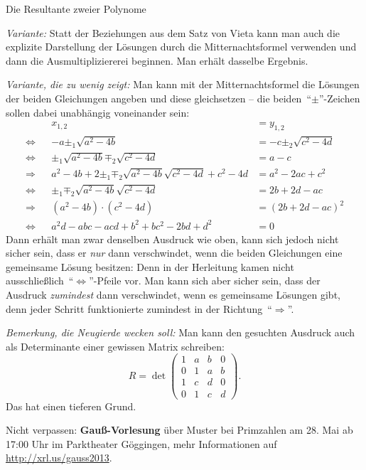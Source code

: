 \documentclass{algblatt}
\begin{document}
\begin{aufgabe}{Die Resultante zweier Polynome}
\begin{loesungE}
\emph{Variante:} Statt der Beziehungen aus dem Satz von Vieta kann man auch die
explizite Darstellung der Lösungen durch die Mitternachtsformel verwenden und
dann die Ausmultipliziererei beginnen. Man erhält dasselbe Ergebnis.

\emph{Variante, die zu wenig zeigt:} Man kann mit der Mitternachtsformel die
Lösungen der beiden Gleichungen angeben und diese gleichsetzen -- die
beiden~"`$\pm$"'-Zeichen sollen dabei unabhängig voneinander sein:
\begin{align*}
  && x_{1,2} &= y_{1,2} \\
  \Longleftrightarrow &&
    -a \pm_1 \sqrt{a^2 - 4b} &= -c \pm_2 \sqrt{c^2 - 4d} \\
  \Longleftrightarrow &&
    \pm_1\sqrt{a^2 - 4b} \mp_2\sqrt{c^2 - 4d} &= a - c \\
  \Longrightarrow &&
    a^2 - 4b + 2 \pm_1 \mp_2 \sqrt{a^2-4b}\sqrt{c^2-4d} + c^2 - 4d &= a^2 - 2ac + c^2 \\
  \Longleftrightarrow &&
    \pm_1 \mp_2 \sqrt{a^2-4b}\sqrt{c^2-4d} &= 2b + 2d - ac \\
  \Longrightarrow &&
    (a^2 - 4b) \cdot (c^2 - 4d) &= (2b + 2d - ac)^2 \\
  \Longleftrightarrow &&
    a^2d - abc - acd + b^2 + bc^2 - 2bd + d^2 &= 0
\end{align*}
Dann erhält man zwar denselben Ausdruck wie oben, kann sich jedoch nicht sicher
sein, dass er \emph{nur} dann verschwindet, wenn die beiden Gleichungen eine
gemeinsame Lösung besitzen: Denn in der Herleitung kamen nicht
ausschließlich~"`$\Leftrightarrow$"'-Pfeile vor. Man kann sich aber sicher
sein, dass der Ausdruck \emph{zumindest} dann verschwindet, wenn es gemeinsame
Lösungen gibt, denn jeder Schritt funktionierte zumindest in der
Richtung~"`$\Rightarrow$"'.

\emph{Bemerkung, die Neugierde wecken soll:} Man kann den gesuchten Ausdruck
auch als Determinante einer gewissen Matrix schreiben:
\[ R = \det\begin{pmatrix}
  1 & a & b & 0 \\
  0 & 1 & a & b \\
  1 & c & d & 0 \\
  0 & 1 & c & d
\end{pmatrix}\!. \]
Das hat einen tieferen Grund.
\end{loesungE}
\end{aufgabe}

Nicht verpassen: \textbf{Gauß-Vorlesung} über Muster bei Primzahlen am 28. Mai
ab 17:00 Uhr im Parktheater Göggingen, mehr Informationen auf
\url{http://xrl.us/gauss2013}.
 
\end{document}
